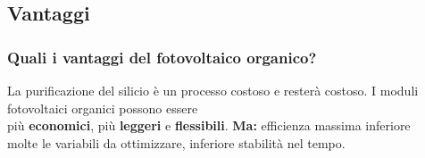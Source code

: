 \documentclass{beamer}
\makeatletter
\newcommand{\tallcell}[2][c]{\begin{tabular}[#1]{@{}c@{}}#2\end{tabular}}
\makeatother
\begin{document}
\subsection{Vantaggi}
\begin{frame}%
\frametitle{Quali i vantaggi del fotovoltaico organico?}
La purificazione del silicio è un processo costoso e resterà costoso.
\vfill
I moduli fotovoltaici organici possono essere \\ più \textbf{economici}, più \textbf{leggeri} e \textbf{flessibili}.
\vfill\pause
{\color{red} \textbf{Ma:}} efficienza massima inferiore\\ molte le variabili da ottimizzare, inferiore stabilità nel tempo.
\end{frame}
\end{document}
